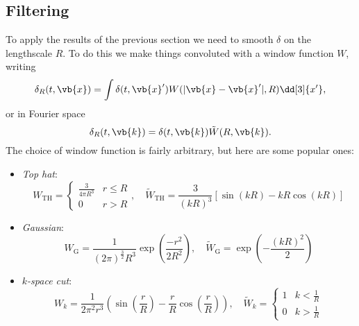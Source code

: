\documentclass{jknotes}
\begin{document}
\subsection{Filtering}
To apply the results of the previous section we need to smooth \(\delta\) on the lengthscale \(R\). To do this we make things convoluted with a window function \(W\), writing
\begin{equation}
    \delta_R(t,\vb{x}) = \int \delta(t,\vb{x}') W(|\vb{x}-\vb{x}'|,R) \dd[3]{x'},
\end{equation}
or in Fourier space
\begin{equation}
    \delta_R(t,\vb{k}) = \delta(t,\vb{k}) \tilde{W}(R,\vb{k}).
\end{equation}
The choice of window function is fairly arbitrary, but here are some popular ones:
\begin{itemize}
    \item \emph{Top hat}:
        \begin{equation}
            W_{\text{TH}} = 
            \begin{cases}
                \frac{3}{4\pi R^3} & r \le R \\
                0 & r > R
            \end{cases},
            \quad
            \tilde{W}_{\text{TH}} = \frac3{(kR)^3}\left[\sin(kR) - kR \cos(kR)\right]
        \end{equation}
    \item \emph{Gaussian}:
        \begin{equation}
            W_{\text{G}} = \frac1{(2\pi)^{\frac32} R^3}\exp(\frac{-r^2}{2R^2}),\quad
            \tilde{W}_{\text{G}} = \exp(-\frac{(kR)^2}2)
        \end{equation}
    \item \emph{\(k\)-space cut}:
        \begin{equation}
            W_k = \frac1{2\pi^2r^3}\left(\sin(\frac{r}{R}) - \frac{r}{R} \cos(\frac{r}{R})\right),\quad
            \tilde{W}_k = 
            \begin{cases}
                1 & k < \frac1R \\
                0 & k > \frac1R
            \end{cases}
        \end{equation}
\end{itemize}
\end{document}
